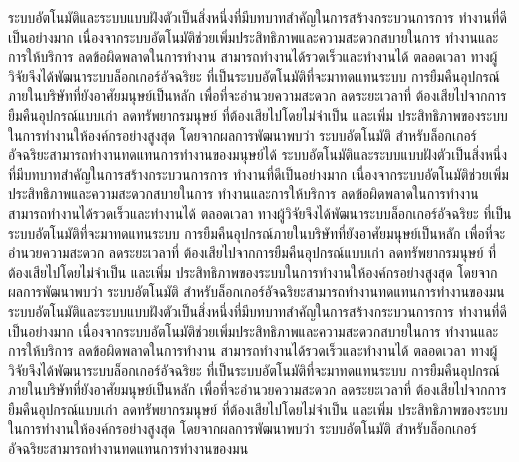 ระบบอัตโนมัติและระบบแบบฝังตัวเป็นสิ่งหนึ่งที่มีบทบาทสำคัญในการสร้างกระบวนการการ
ทำงานที่ดีเป็นอย่างมาก เนื่องจากระบบอัตโนมัติช่วยเพิ่มประสิทธิภาพและความสะดวกสบายในการ
ทำงานและการให้บริการ ลดข้อผิดพลาดในการทำงาน สามารถทำงานได้รวดเร็วและทำงานได้
ตลอดเวลา ทางผู้วิจัยจึงได้พัฒนาระบบล็อกเกอร์อัจฉริยะ ที่เป็นระบบอัตโนมัติที่จะมาทดแทนระบบ
การยืมคืนอุปกรณ์ภายในบริษัทที่ยังอาศัยมนุษย์เป็นหลัก เพื่อที่จะอำนวยความสะดวก ลดระยะเวลาที่
ต้องเสียไปจากการยืมคืนอุปกรณ์แบบเก่า ลดทรัพยากรมนุษย์ ที่ต้องเสียไปโดยไม่จำเป็น และเพิ่ม
ประสิทธิภาพของระบบในการทำงานให้องค์กรอย่างสูงสุด โดยจากผลการพัฒนาพบว่า ระบบอัตโนมัติ
สำหรับล็อกเกอร์อัจฉริยะสามารถทำงานทดแทนการทำงานของมนุษย์ได้
ระบบอัตโนมัติและระบบแบบฝังตัวเป็นสิ่งหนึ่งที่มีบทบาทสำคัญในการสร้างกระบวนการการ
ทำงานที่ดีเป็นอย่างมาก เนื่องจากระบบอัตโนมัติช่วยเพิ่มประสิทธิภาพและความสะดวกสบายในการ
ทำงานและการให้บริการ ลดข้อผิดพลาดในการทำงาน สามารถทำงานได้รวดเร็วและทำงานได้
ตลอดเวลา ทางผู้วิจัยจึงได้พัฒนาระบบล็อกเกอร์อัจฉริยะ ที่เป็นระบบอัตโนมัติที่จะมาทดแทนระบบ
การยืมคืนอุปกรณ์ภายในบริษัทที่ยังอาศัยมนุษย์เป็นหลัก เพื่อที่จะอำนวยความสะดวก ลดระยะเวลาที่
ต้องเสียไปจากการยืมคืนอุปกรณ์แบบเก่า ลดทรัพยากรมนุษย์ ที่ต้องเสียไปโดยไม่จำเป็น และเพิ่ม
ประสิทธิภาพของระบบในการทำงานให้องค์กรอย่างสูงสุด โดยจากผลการพัฒนาพบว่า ระบบอัตโนมัติ
สำหรับล็อกเกอร์อัจฉริยะสามารถทำงานทดแทนการทำงานของมน
ระบบอัตโนมัติและระบบแบบฝังตัวเป็นสิ่งหนึ่งที่มีบทบาทสำคัญในการสร้างกระบวนการการ
ทำงานที่ดีเป็นอย่างมาก เนื่องจากระบบอัตโนมัติช่วยเพิ่มประสิทธิภาพและความสะดวกสบายในการ
ทำงานและการให้บริการ ลดข้อผิดพลาดในการทำงาน สามารถทำงานได้รวดเร็วและทำงานได้
ตลอดเวลา ทางผู้วิจัยจึงได้พัฒนาระบบล็อกเกอร์อัจฉริยะ ที่เป็นระบบอัตโนมัติที่จะมาทดแทนระบบ
การยืมคืนอุปกรณ์ภายในบริษัทที่ยังอาศัยมนุษย์เป็นหลัก เพื่อที่จะอำนวยความสะดวก ลดระยะเวลาที่
ต้องเสียไปจากการยืมคืนอุปกรณ์แบบเก่า ลดทรัพยากรมนุษย์ ที่ต้องเสียไปโดยไม่จำเป็น และเพิ่ม
ประสิทธิภาพของระบบในการทำงานให้องค์กรอย่างสูงสุด โดยจากผลการพัฒนาพบว่า ระบบอัตโนมัติ
สำหรับล็อกเกอร์อัจฉริยะสามารถทำงานทดแทนการทำงานของมน